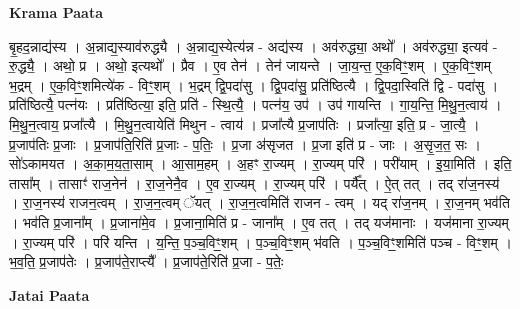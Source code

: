 \documentclass[17pt]{extarticle}
\begin{document}
\textbf{Krama Paata} \newline

बृ॒हद॒न्नाद्य॑स्य । अ॒न्नाद्य॒स्याव॑रुद्ध्यै । अ॒न्नाद्य॒स्येत्य॑न्न - अद्य॑स्य । अव॑रुद्ध्या॒ अथो᳚ । अव॑रुद्ध्या॒ इत्यव॑ - रु॒द्ध्यै॒ । अथो॒ प्र । अथो॒ इत्यथो᳚ । प्रैव । ए॒व तेन॑ । तेन॑ जायन्ते । जा॒य॒न्त॒ ए॒क॒विꣳ॒॒शम् । ए॒क॒विꣳ॒॒शम् भ॒द्रम् । ए॒क॒विꣳ॒॒शमित्ये॑क - विꣳ॒॒शम् । भ॒द्रम् द्वि॒पदा॑सु । द्वि॒पदा॑सु॒ प्रति॑ष्ठित्यै । द्वि॒पदा॒स्विति॑ द्वि - पदा॑सु । प्रति॑ष्ठित्यै॒ पत्न॑यः । प्रति॑ष्ठित्या॒ इति॒ प्रति॑ - स्थि॒त्यै॒ । पत्न॑य॒ उप॑ । उप॑ गायन्ति । गा॒य॒न्ति॒ मि॒थु॒न॒त्वाय॑ । मि॒थु॒न॒त्वाय॒ प्रजा᳚त्यै । मि॒थु॒न॒त्वायेति॑ मिथुन - त्वाय॑ । प्रजा᳚त्यै प्र॒जाप॑तिः । प्रजा᳚त्या॒ इति॒ प्र - जा॒त्यै॒ । प्र॒जाप॑तिः प्र॒जाः । प्र॒जाप॑ति॒रिति॑ प्र॒जाः - प॒तिः॒ । प्र॒जा अ॑सृजत । प्र॒जा इति॑ प्र - जाः । अ॒सृ॒ज॒त॒ सः । सो॑ऽकामयत । अ॒का॒म॒य॒ता॒साम् । आ॒साम॒हम् । अ॒हꣳ रा॒ज्यम् । रा॒ज्यम् परि॑ । परी॑याम् । इ॒या॒मिति॑ । इति॒ तासा᳚म् । तासाꣳ॑ राज॒नेन॑ । रा॒ज॒नेनै॒व । ए॒व रा॒ज्यम् । रा॒ज्यम् परि॑ । पर्यै᳚त् । ऐ॒त् तत् । तद् रा॑ज॒नस्य॑ । रा॒ज॒नस्य॑ राजन॒त्वम् । रा॒ज॒न॒त्वम् ॅयत् । रा॒ज॒न॒त्वमिति॑ राजन - त्वम् । यद् रा॑ज॒नम् । रा॒ज॒नम् भव॑ति । भव॑ति प्र॒जाना᳚म् । प्र॒जाना॑मे॒व । प्र॒जाना॒मिति॑ प्र - जाना᳚म् । ए॒व तत् । तद् यज॑मानाः । यज॑माना रा॒ज्यम् । रा॒ज्यम् परि॑ । परि॑ यन्ति । य॒न्ति॒ प॒ञ्च॒विꣳ॒॒शम् । प॒ञ्च॒विꣳ॒॒शम् भ॑वति । प॒ञ्च॒विꣳ॒॒शमिति॑ पञ्च - विꣳ॒॒शम् । भ॒व॒ति॒ प्र॒जाप॑तेः । प्र॒जाप॑ते॒राप्त्यै᳚ । प्र॒जाप॑ते॒रिति॑ प्र॒जा - प॒तेः॒ \newline

\textbf{Jatai Paata} \newline
\end{document}
